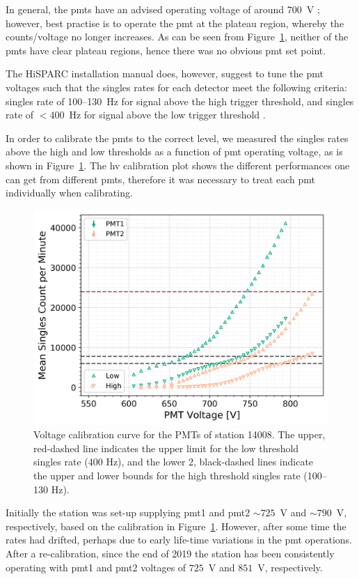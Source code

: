 In general, the \glspl{pmt} have an advised operating voltage of around 700~V \citep{fokkema_hisparc_2019}; however, best practise is to operate the \gls{pmt} at the plateau region, whereby the counts/voltage no longer increases. As can be seen from Figure~\ref{fig:PMT_cal}, neither of the \glspl{pmt} have clear plateau regions, hence there was no obvious \gls{pmt} set point.

The HiSPARC installation manual does, however, suggest to tune the \gls{pmt} voltages such that the singles rates for each detector meet the following criteria: singles rate of 100--130~Hz for signal above the high trigger threshold, and singles rate of $<$400~Hz for signal above the low trigger threshold \citep{fokkema_hisparc_2019}.

In order to calibrate the \glspl{pmt} to the correct level, we measured the singles rates above the high and low thresholds as a function of \gls{pmt} operating voltage, as is shown in Figure~\ref{fig:PMT_cal}. The \gls{hv} calibration plot shows the different performances one can get from different \glspl{pmt}, therefore it was necessary to treat each \gls{pmt} individually when calibrating.

\begin{figure}[ht!]
	\centering
	\includegraphics[width=0.8\columnwidth]{both_PMTs_post_NIM.png}
	\caption{Voltage calibration curve for the PMTs of station 14008. The upper, red-dashed line indicates the upper limit for the low threshold singles rate (400 Hz), and the lower 2, black-dashed lines indicate the upper and lower bounds for the high threshold singles rate (100--130 Hz).}
	\label{fig:PMT_cal}
\end{figure}

Initially the station was set-up supplying \gls{pmt}1 and \gls{pmt}2 $\sim725$~V and $\sim790$~V, respectively, based on the calibration in Figure~\ref{fig:PMT_cal}. However, after some time the rates had drifted, perhaps due to early life-time variations in the \gls{pmt} operations. After a re-calibration, since the end of 2019 the station has been consistently operating with \gls{pmt}1 and \gls{pmt}2 voltages of $725$~V and $851$~V, respectively.




